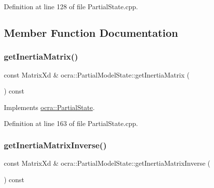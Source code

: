 Definition at line 128 of file Partial\+State.\+cpp.



\subsection{Member Function Documentation}
\hypertarget{classocra_1_1PartialModelState_a9fe03ab8c3c4afe56ee4b59f96ac4a25}{}\label{classocra_1_1PartialModelState_a9fe03ab8c3c4afe56ee4b59f96ac4a25} 
\subsubsection{\texorpdfstring{get\+Inertia\+Matrix()}{getInertiaMatrix()}}
{\footnotesize\ttfamily const Matrix\+Xd \& ocra\+::\+Partial\+Model\+State\+::get\+Inertia\+Matrix (\begin{DoxyParamCaption}{ }\end{DoxyParamCaption}) const\hspace{0.3cm}{\ttfamily [virtual]}}



Implements \hyperlink{classocra_1_1PartialState_ad811a25932f0fad439242ebd48841162}{ocra\+::\+Partial\+State}.



Definition at line 163 of file Partial\+State.\+cpp.

\hypertarget{classocra_1_1PartialModelState_a664e4f70861eefde844dca6dd09a2213}{}\label{classocra_1_1PartialModelState_a664e4f70861eefde844dca6dd09a2213} 
\subsubsection{\texorpdfstring{get\+Inertia\+Matrix\+Inverse()}{getInertiaMatrixInverse()}}
{\footnotesize\ttfamily const Matrix\+Xd \& ocra\+::\+Partial\+Model\+State\+::get\+Inertia\+Matrix\+Inverse (\begin{DoxyParamCaption}{ }\end{DoxyParamCaption}) const\hspace{0.3cm}{\ttfamily [virtual]}}



